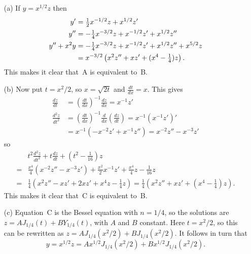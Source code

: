 \documentclass[a4paper]{amsart}
\begin{document}
\begin{solution}\leavevmode
 \begin{itemize}
  \item[(a)] If $y=x^{1/2}z$ then
   \begin{align*}
    y' &= \tfrac{1}{2} x^{-1/2}z + x^{1/2}z' \\
    y'' &= -\tfrac{1}{4} x^{-3/2}z + x^{-1/2}z' + x^{1/2}z'' \\
    y''+x^2y &= -\tfrac{1}{4} x^{-3/2}z + x^{-1/2}z' + x^{1/2}z'' + x^{5/2}z \\
     &= x^{-3/2}\left(x^2z'' + xz' + (x^4-\tfrac{1}{4})z\right).
   \end{align*}
   This makes it clear that~A is equivalent to~B.
  \item[(b)] Now put $t=x^2/2$, so $x=\sqrt{2t}$ and
   $\frac{dt}{dx}=x$.  This gives 
   \begin{align*}
    \frac{dz}{dt} &= \left(\frac{dt}{dx}\right)^{-1} \frac{dz}{dx}
                   = x^{-1}z' \\
    \frac{d^2z}{dt^2} &=
     \left(\frac{dt}{dx}\right)^{-1} \frac{d}{dx}\left(\frac{dz}{dt}\right)
     = x^{-1} (x^{-1}z')' \\
     &= x^{-1}(-x^{-2}z'+x^{-1}z'')
      = x^{-2}z'' - x^{-3}z'
   \end{align*}
   so 
   \begin{align*}
    & t^2\frac{d^2z}{dt^2} + t\frac{dz}{dt} + (t^2 - \tfrac{1}{16}) z \\
    =& \frac{x^4}{4}(x^{-2}z''-x^{-3}z') + 
       \frac{x^2}{2}x^{-1}z' +
       \frac{x^4}{4}z - \frac{1}{16}z \\
    =& \frac{1}{4}\left(
        x^2z'' -xz' + 2xz' + x^4 z - \tfrac{1}{4}z
       \right)
    = \frac{1}{4}\left(x^2z''+xz'+(x^4-\tfrac{1}{4})z\right).
   \end{align*}
   This makes it clear that~C is equivalent to~B.
  \item[(c)] Equation~C is the Bessel equation with $n=1/4$, so the
   solutions are $z=AJ_{1/4}(t)+BY_{1/4}(t)$, with $A$ and $B$
   constant.  Here $t=x^2/2$, so this can be rewritten as
   $z=AJ_{1/4}(x^2/2)+BJ_{1/4}(x^2/2)$.  It follows in turn that
   \[ y = x^{1/2}z = Ax^{1/2}J_{1/4}(x^2/2)+Bx^{1/2}J_{1/4}(x^2/2). \]
 \end{itemize}
\end{solution}
\end{document}

